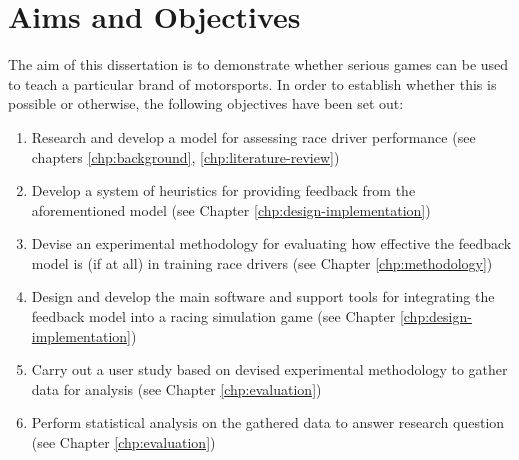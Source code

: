 \section{Aims and Objectives}
The aim of this dissertation is to demonstrate whether serious games can be used to teach a particular brand of motorsports. In order to establish whether this is possible or otherwise, the following objectives have been set out:

\begin{enumerate}
	\item Research and develop a model for assessing race driver performance (see chapters \ref{chp:background}, \ref{chp:literature-review})
	\item Develop a system of heuristics for providing feedback from the aforementioned model (see Chapter \ref{chp:design-implementation})
	\item Devise an experimental methodology for evaluating how effective the feedback model is (if at all) in training race drivers (see Chapter \ref{chp:methodology})
	\item Design and develop the main software and support tools for integrating the feedback model into a racing simulation game (see Chapter \ref{chp:design-implementation})
	\item Carry out a user study based on devised experimental methodology to gather data for analysis (see Chapter \ref{chp:evaluation})
	\item Perform statistical analysis on the gathered data to answer research question (see Chapter \ref{chp:evaluation})
\end{enumerate}

%
%


